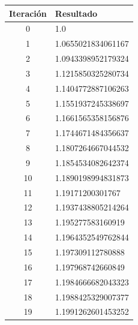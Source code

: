 \documentclass[titlepage,a4paper]{article}
\begin{document}
\begin{multicols}{2}
    \begin{center}
        \begin{tabular}{| c | l |}
        \hline
         Iteración & Resultado \\ \hline
  0     &  1.0 \\
1     &  1.0655021834061167 \\
2     &  1.0943398952179324 \\
3     &  1.1215850325280734 \\
4     &  1.1404772887106263 \\
5     &  1.1551937245338697 \\
6     &  1.1661565358156876 \\
7     &  1.1744671484356637 \\
8     &  1.1807264667044532 \\
9     &  1.1854534082642374 \\
10     &  1.1890198994831873 \\
11     &  1.19171200301767 \\
12     &  1.1937438805214264 \\
13     &  1.195277583160919 \\
14     &  1.1964352549762844 \\
15     &  1.197309112780888 \\
16     &  1.197968742660849 \\
17     &  1.1984666682043323 \\
18     &  1.1988425329007377 \\
19     &  1.1991262601453252 \\


\end{tabular}
\end{center}
\end{multicols}
\end{document}
